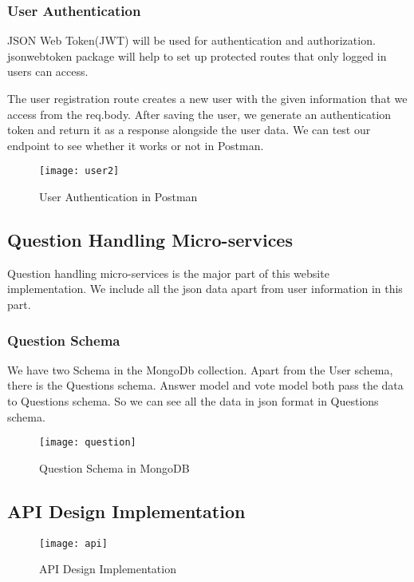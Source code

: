 \documentclass[11pt]{article}
\begin{document}
\subsubsection{User Authentication}
JSON Web Token(JWT) will be used for authentication and authorization. jsonwebtoken package will help to set up protected routes that only logged in users can access.

The user registration route creates a new user with the given information that we access from the req.body. After saving the user, we generate an authentication token and return it as a response alongside the user data. 
We can test our endpoint to see whether it works or not in Postman. 
\begin{figure}[htp]
    \centering
    \texttt{[image: user2]}
    \caption{User Authentication in Postman}
    \label{fig:galaxy}
\end{figure}

\newpage
\subsection{Question Handling Micro-services}
Question handling micro-services is the major part of this website implementation. We include all the json data apart from user information in this part. 
\subsubsection{Question Schema}
We have two Schema in the MongoDb collection. Apart from the User schema, there is the Questions schema. Answer model and vote model both pass the data to Questions schema. So we can see all the data in json format in Questions schema. 

\begin{figure}[htp]
    \centering
    \texttt{[image: question]}
    \caption{Question Schema in MongoDB}
    \label{fig:galaxy}
\end{figure}


\subsection{API Design Implementation}

\begin{figure}[htp]
    \centering
    \texttt{[image: api]}
    \caption{API Design Implementation}
    \label{fig:galaxy}
\end{figure}
\end{document}
